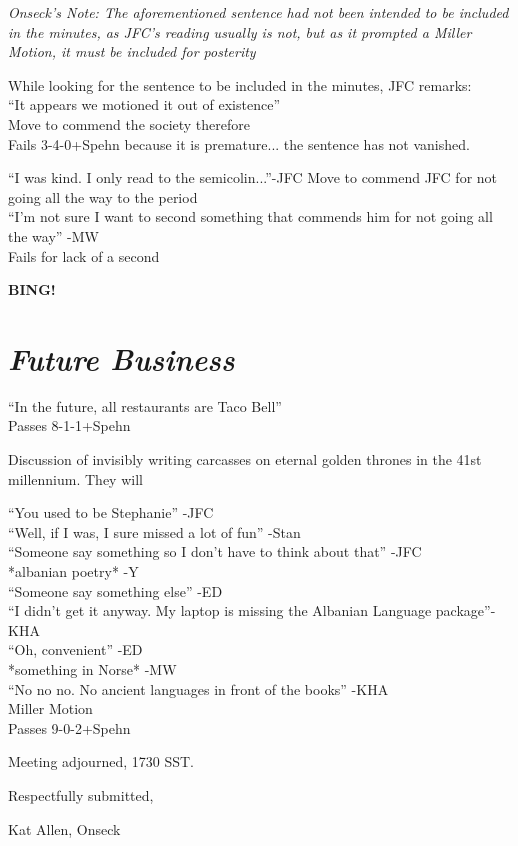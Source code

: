 \documentclass[10pt]{article}
\newcommand{\bing}{{\bf BING!} }
\newcommand{\goto}[1]{\bing \vskip 12pt \section*{{\em{#1}}}}
\begin{document}
\emph{Onseck's Note: The aforementioned sentence had not been intended to be included in the minutes, as JFC's reading usually is not, but as it prompted a Miller Motion, it must be included for posterity}

While looking for the sentence to be included in the minutes, JFC remarks:\\
``It appears we motioned it out of existence''\\

Move to commend the society therefore\\
Fails 3-4-0+Spehn because it is premature... the sentence has not vanished.

``I was kind. I only read to the semicolin...''-JFC
Move to commend JFC for not going all the way to the period \\
``I'm not sure I want to second something that commends him for not
going all the way'' -MW\\
Fails for lack of a second

\goto{Future Business}
``In the future, all restaurants are Taco Bell''\\
Passes 8-1-1+Spehn

Discussion of invisibly writing carcasses on eternal golden thrones in
the 41st millennium.  They will 

``You used to be Stephanie'' -JFC\\
``Well, if I was, I sure missed a lot of fun'' -Stan\\
``Someone say something so I don't have to think about that'' -JFC\\
*albanian poetry* -Y\\
``Someone say something else'' -ED\\
``I didn't get it anyway. My laptop is missing the Albanian Language package''-KHA\\
``Oh, convenient'' -ED\\
*something in Norse* -MW\\
``No no no. No ancient languages in front of the books'' -KHA\\

Miller Motion\\
Passes 9-0-2+Spehn

\vspace{12pt}

\noindent
Meeting adjourned, 1730 SST.

\vspace{18pt}

\centerline{Respectfully submitted,}
\centerline{Kat Allen,  Onseck}
\end{document}
